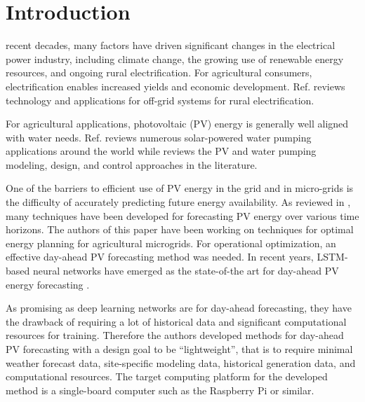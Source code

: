 \section{Introduction}
\label{sec:intro}

 recent decades, many factors have driven significant changes in the electrical power industry,
including climate change,
the growing use of renewable energy resources,
and ongoing rural electrification.
For agricultural consumers, electrification enables increased yields and economic development.
Ref. \cite{Mandelli2016} reviews technology and applications for off-grid systems for rural electrification.

For agricultural applications, photovoltaic (PV) energy is generally well aligned with water needs\cite{Aliyu2018}.
Ref. \cite{Aliyu2018} reviews numerous solar-powered water pumping applications around the world while \cite{Muhsen2017} reviews the PV and water pumping modeling, design, and control approaches in the literature.

One of the barriers to efficient use of PV energy in the grid and in micro-grids
is the difficulty of accurately predicting future energy availability.
As reviewed in \cite{Antonanzas2016}, many techniques have been developed for forecasting PV energy over various time horizons.
The authors of this paper have been working on techniques for optimal energy planning for agricultural microgrids.
For operational optimization, an effective day-ahead PV forecasting method was needed.
In recent years, LSTM-based neural networks have emerged as the state-of-the art
for day-ahead PV energy forecasting
\cite{Aillaud2020,Aslam2021,Gao2019}.

As promising as deep learning networks are for day-ahead forecasting,
they have the drawback of requiring 
a lot of historical data and significant computational resources for training.
Therefore the authors developed methods for day-ahead PV forecasting with a design goal to be ``lightweight'', that is to require minimal weather forecast data, site-specific modeling data, historical generation data, and computational resources.
The target computing platform for the developed method is a single-board computer such as the Raspberry Pi or similar.
